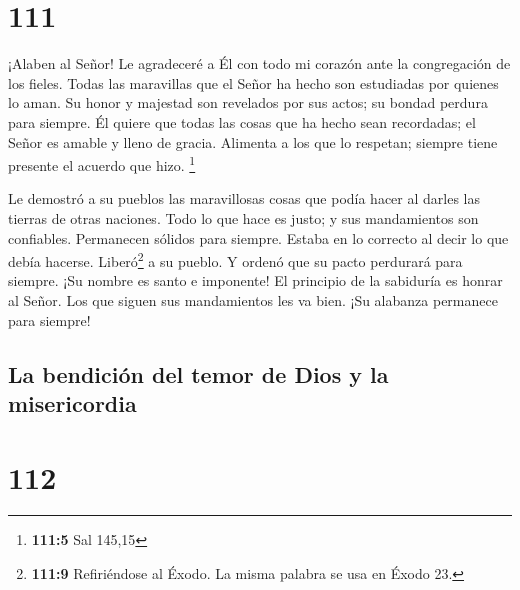 \hypertarget{section-110}{%
\section{111}\label{section-110}}

 ¡Alaben al Señor! Le agradeceré a Él con todo mi corazón
ante la congregación de los fieles.  Todas las maravillas
que el Señor ha hecho son estudiadas por quienes lo aman. 
Su honor y majestad son revelados por sus actos; su bondad perdura para
siempre.  Él quiere que todas las cosas que ha hecho sean
recordadas; el Señor es amable y lleno de gracia. 
Alimenta a los que lo respetan; siempre tiene presente el acuerdo que
hizo. \footnote{\textbf{111:5} Sal 145,15}

 Le demostró a su pueblos las maravillosas cosas que podía
hacer al darles las tierras de otras naciones.  Todo lo
que hace es justo; y sus mandamientos son confiables. 
Permanecen sólidos para siempre. Estaba en lo correcto al decir lo que
debía hacerse.  Liberó\footnote{\textbf{111:9}
  Refiriéndose al Éxodo. La misma palabra se usa en Éxodo 23.} a su
pueblo. Y ordenó que su pacto perdurará para siempre. ¡Su nombre es
santo e imponente!  El principio de la sabiduría es
honrar al Señor. Los que siguen sus mandamientos les va bien. ¡Su
alabanza permanece para siempre!

\hypertarget{la-bendiciuxf3n-del-temor-de-dios-y-la-misericordia}{%
\subsection{La bendición del temor de Dios y la
misericordia}\label{la-bendiciuxf3n-del-temor-de-dios-y-la-misericordia}}

\hypertarget{section-111}{%
\section{112}\label{section-111}}

